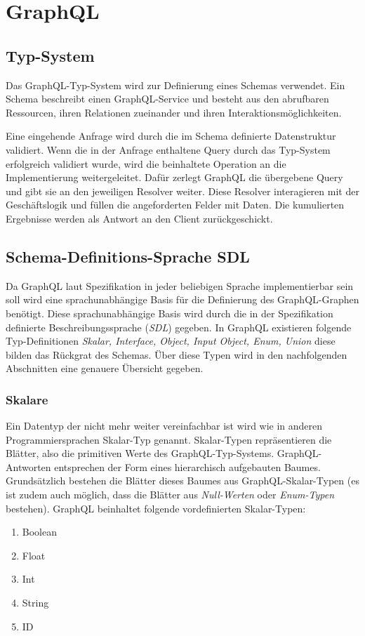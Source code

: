\chapter{GraphQL}
\section{Typ-System}

Das GraphQL-Typ-System wird zur Definierung eines Schemas verwendet.
Ein Schema beschreibt einen GraphQL-Service und besteht aus den abrufbaren Ressourcen, ihren Relationen zueinander und ihren Interaktionsmöglichkeiten.


Eine eingehende Anfrage wird durch die im Schema definierte Datenstruktur validiert.
Wenn die in der Anfrage enthaltene Query durch das Typ-System erfolgreich validiert wurde, wird die beinhaltete Operation an die Implementierung weitergeleitet.
Dafür zerlegt GraphQL die übergebene Query und gibt sie an den jeweiligen Resolver weiter. Diese Resolver interagieren mit der Geschäftslogik und füllen die angeforderten Felder mit Daten.
Die kumulierten Ergebnisse werden als Antwort an den Client zurückgeschickt. 


\section{Schema-Definitions-Sprache SDL}
Da GraphQL laut Spezifikation in jeder beliebigen Sprache implementierbar sein soll wird eine sprachunabhängige Basis für die Definierung des GraphQL-Graphen benötigt.
Diese sprachunabhängige Basis wird durch die in der Spezifikation definierte Beschreibungssprache (\textit{SDL}) gegeben. 
In GraphQL existieren folgende Typ-Definitionen \textit{Skalar, Interface, Object, Input Object, Enum, Union} diese bilden das Rückgrat des Schemas.
Über diese Typen wird in den nachfolgenden Abschnitten eine genauere Übersicht gegeben.

\subsection{Skalare}

Ein Datentyp der nicht mehr weiter vereinfachbar ist wird wie in anderen Programmiersprachen Skalar-Typ genannt.
Skalar-Typen repräsentieren die Blätter, also die primitiven Werte des GraphQL-Typ-Systems. %
GraphQL-Antworten entsprechen der Form eines hierarchisch aufgebauten Baumes.
\newline
Grundsätzlich bestehen die Blätter dieses Baumes aus GraphQL-Skalar-Typen (es ist zudem auch möglich, dass die Blätter aus \textit{Null-Werten} oder \textit{Enum-Typen} bestehen).
GraphQL beinhaltet folgende vordefinierten Skalar-Typen:
\begin{enumerate}
    \item Boolean
    \item Float
    \item Int
    \item String
    \item ID
\end{enumerate}

